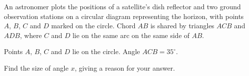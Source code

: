 \begin{question}
\noindent An astronomer plots the positions of a satellite's dish reflector and two ground observation stations on a circular diagram representing the horizon, with points $A$, $B$, $C$ and $D$ marked on the circle. Chord $AB$ is shared by triangles $ACB$ and $ADB$, where $C$ and $D$ lie on the same arc on the same side of $AB$.

\begin{center}
\end{center}

\noindent Points $A$, $B$, $C$ and $D$ lie on the circle. Angle $ACB = 35^\circ$.

Find the size of angle $x$, giving a reason for your answer.

\vspace{4.5cm}

\begin{flushright}
\end{flushright}
\end{question}
